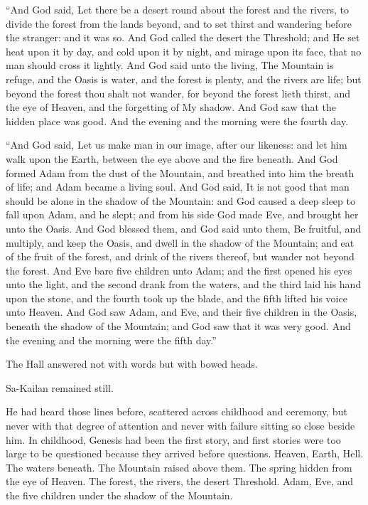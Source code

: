 \begin{scripture}
“And God said, Let there be a desert round about the forest and the rivers, to divide the forest from the lands beyond, and to set thirst and wandering before the stranger: and it was so. And God called the desert the Threshold; and He set heat upon it by day, and cold upon it by night, and mirage upon its face, that no man should cross it lightly. And God said unto the living, The Mountain is refuge, and the Oasis is water, and the forest is plenty, and the rivers are life; but beyond the forest thou shalt not wander, for beyond the forest lieth thirst, and the eye of Heaven, and the forgetting of My shadow. And God saw that the hidden place was good. And the evening and the morning were the fourth day.
\end{scripture}

\begin{scripture}
“And God said, Let us make man in our image, after our likeness: and let him walk upon the Earth, between the eye above and the fire beneath. And God formed Adam from the dust of the Mountain, and breathed into him the breath of life; and Adam became a living soul. And God said, It is not good that man should be alone in the shadow of the Mountain: and God caused a deep sleep to fall upon Adam, and he slept; and from his side God made Eve, and brought her unto the Oasis. And God blessed them, and God said unto them, Be fruitful, and multiply, and keep the Oasis, and dwell in the shadow of the Mountain; and eat of the fruit of the forest, and drink of the rivers thereof, but wander not beyond the forest. And Eve bare five children unto Adam; and the first opened his eyes unto the light, and the second drank from the waters, and the third laid his hand upon the stone, and the fourth took up the blade, and the fifth lifted his voice unto Heaven. And God saw Adam, and Eve, and their five children in the Oasis, beneath the shadow of the Mountain; and God saw that it was very good. And the evening and the morning were the fifth day.”
\end{scripture}

The Hall answered not with words but with bowed heads.\par

Sa-Kailan remained still.\par

He had heard those lines before, scattered across childhood and ceremony, but never with that degree of attention and never with failure sitting so close beside him. In childhood, Genesis had been the first story, and first stories were too large to be questioned because they arrived before questions. Heaven, Earth, Hell. The waters beneath. The Mountain raised above them. The spring hidden from the eye of Heaven. The forest, the rivers, the desert Threshold. Adam, Eve, and the five children under the shadow of the Mountain.\par

